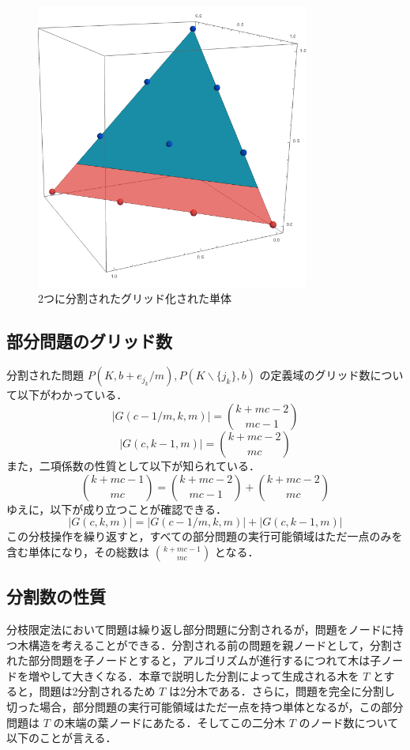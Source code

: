 \documentclass[a4paper,11pt]{jreport}
\begin{document}
\begin{figure}
\begin{center}
\includegraphics[width=9cm]{graphs/divided_simplices.png}
\caption{2つに分割されたグリッド化された単体}
\label{fig:divided_simplices}
\end{center}
\end{figure}

\subsection{部分問題のグリッド数}

分割された問題 $ P(K, b + e_{j_k} / m), P(K \backslash \{ j_k \}, b) $ の定義域のグリッド数について以下がわかっている．
$$ | G(c - 1/m, k, m) | = \binom{k + mc - 2}{mc - 1} $$
$$ | G(c, k - 1, m) | = \binom{k + mc - 2}{mc} $$
また，二項係数の性質として以下が知られている．
$$ \binom{k + mc - 1}{mc} = \binom{k + mc - 2}{mc - 1} + \binom{k + mc - 2}{mc} $$
ゆえに，以下が成り立つことが確認できる．
$$ | G(c, k, m) | = | G(c - 1/m, k, m) | + | G(c, k - 1, m) | $$
この分枝操作を繰り返すと，すべての部分問題の実行可能領域はただ一点のみを含む単体になり，その総数は $ \binom{k + mc - 1}{mc} $ となる．\par

\subsection{分割数の性質} \label{sec:number_of_partition}

分枝限定法において問題は繰り返し部分問題に分割されるが，問題をノードに持つ木構造を考えることができる．分割される前の問題を親ノードとして，分割された部分問題を子ノードとすると，アルゴリズムが進行するにつれて木は子ノードを増やして大きくなる．本章で説明した分割によって生成される木を $ T $ とすると，問題は2分割されるため $ T $ は2分木である．さらに，問題を完全に分割し切った場合，部分問題の実行可能領域はただ一点を持つ単体となるが，この部分問題は $ T $ の末端の葉ノードにあたる．そしてこの二分木 $ T $ のノード数について以下のことが言える．
\end{document}
